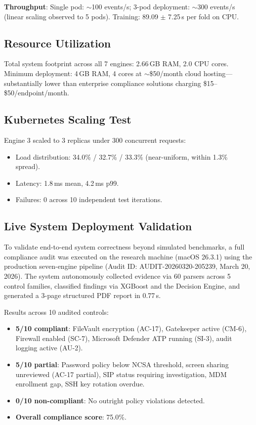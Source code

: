 \documentclass[futureinternet,article,submit,pdftex,moreauthors]{Definitions/mdpi}
\begin{document}
\textbf{Throughput}: Single pod: $\sim$100 events/s; 3-pod deployment: $\sim$300 events/s
(linear scaling observed to 5 pods). Training: 89.09 $\pm$ 7.25\,s per fold on CPU.

\subsection{Resource Utilization}

Total system footprint across all 7 engines: 2.66\,GB RAM, 2.0 CPU cores. Minimum deployment:
4\,GB RAM, 4 cores at $\sim$\$50/month cloud hosting---substantially lower than enterprise
compliance solutions charging \$15--\$50/endpoint/month.

\subsection{Kubernetes Scaling Test}

Engine 3 scaled to 3 replicas under 300 concurrent requests:
\begin{itemize}
\item Load distribution: 34.0\% / 32.7\% / 33.3\% (near-uniform, within 1.3\% spread).
\item Latency: 1.8\,ms mean, 4.2\,ms p99.
\item Failures: 0 across 10 independent test iterations.
\end{itemize}

\subsection{Live System Deployment Validation}
\label{sec:live_deployment}

To validate end-to-end system correctness beyond simulated benchmarks, a full compliance audit
was executed on the research machine (macOS 26.3.1) using the production seven-engine pipeline
(Audit ID: AUDIT-20260320-205239, March 20, 2026). The system autonomously collected evidence
via 60 parsers across 5 control families, classified findings via XGBoost and the Decision
Engine, and generated a 3-page structured PDF report in 0.77\,s.

Results across 10 audited controls:
\begin{itemize}
\item \textbf{5/10 compliant}: FileVault encryption (AC-17), Gatekeeper active (CM-6),
Firewall enabled (SC-7), Microsoft Defender ATP running (SI-3), audit logging active (AU-2).
\item \textbf{5/10 partial}: Password policy below NCSA threshold, screen sharing unreviewed
(AC-17 partial), SIP status requiring investigation, MDM enrollment gap, SSH key rotation
overdue.
\item \textbf{0/10 non-compliant}: No outright policy violations detected.
\item \textbf{Overall compliance score}: 75.0\%.
\end{itemize}
\end{document}
